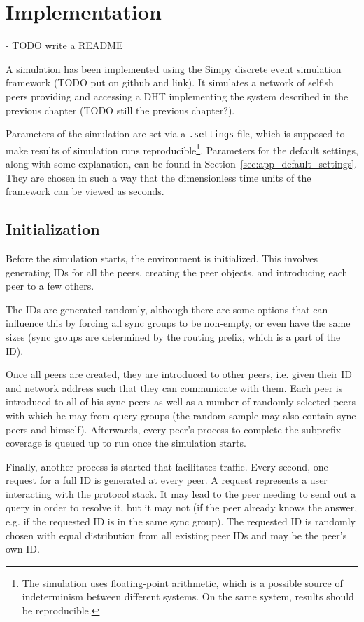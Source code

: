 \chapter{Implementation}
\label{chap:implementation}
- TODO write a README

A simulation has been implemented using the Simpy discrete event simulation
framework (TODO put on github and link). It simulates a network of selfish peers
providing and accessing a \ac{DHT} implementing the system described in the
previous chapter (TODO still the previous chapter?).

Parameters of the simulation are set via a \texttt{.settings} file, which is
supposed to make results of simulation runs reproducible\footnote{The simulation
uses floating-point arithmetic, which is a possible source of indeterminism
between different systems\cite{dawson2013determinism}. On the same system,
results should be reproducible.}. Parameters for the default settings, along
with some explanation, can be found in Section~\ref{sec:app_default_settings}.
They are chosen in such a way that the dimensionless time units of the
framework can be viewed as seconds.

\section{Initialization}
Before the simulation starts, the environment is initialized. This involves
generating IDs for all the peers, creating the peer objects, and introducing
each peer to a few others.

The IDs are generated randomly, although there are some options that can
influence this by forcing all sync groups to be non-empty, or even have the same
sizes (sync groups are determined by the routing prefix, which is a part of the
ID).

Once all peers are created, they are introduced to other peers, i.e. given their
ID and network address such that they can communicate with them. Each peer is
introduced to all of his sync peers as well as a number of randomly selected
peers with which he may from query groups (the random sample may also contain
sync peers and himself). Afterwards, every peer's process to complete the
subprefix coverage is queued up to run once the simulation starts.

Finally, another process is started that facilitates traffic. Every second, one
request for a full ID is generated at every peer. A request represents a user
interacting with the protocol stack. It may lead to the peer needing to send out
a query in order to resolve it, but it may not (if the peer already knows the
answer, e.g. if the requested ID is in the same sync group). The requested ID is
randomly chosen with equal distribution from all existing peer IDs and may be
the peer's own ID.

